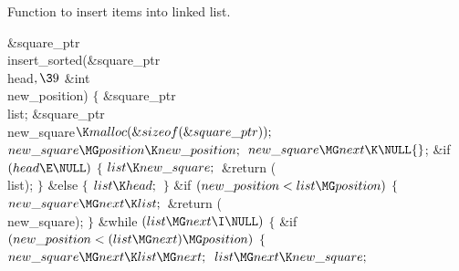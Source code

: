 Function to insert items into linked list.

\Y\B\&{square\_ptr} \\{insert\_sorted}(\&{square\_ptr} \\{head}${},\39{}$%
\&{int} \\{new\_position})\1\1\2\2\6
${}\{{}$\1\6
\&{square\_ptr} \\{list};\6
\&{square\_ptr} \\{new\_square}${}\K\\{malloc}(\&{sizeof}(\&{square\_ptr}));{}$%
\7
${}\\{new\_square}\MG\\{position}\K\\{new\_position};{}$\6
${}\\{new\_square}\MG\\{next}\K\NULL{}$;\6
\&{if} ${}(\\{head}\E\NULL){}$\5
${}\{{}$\1\6
${}\\{list}\K\\{new\_square};{}$\6
\&{return} (\\{list});\6
\4${}\}{}$\2\6
\&{else}\5
${}\{{}$\1\6
${}\\{list}\K\\{head};{}$\6
\4${}\}{}$\2\6
\&{if} ${}(\\{new\_position}<\\{list}\MG\\{position}){}$\5
${}\{{}$\1\6
${}\\{new\_square}\MG\\{next}\K\\{list};{}$\6
\&{return} (\\{new\_square});\6
\4${}\}{}$\2\6
\&{while} ${}(\\{list}\MG\\{next}\I\NULL){}$\5
${}\{{}$\1\6
\&{if} ${}(\\{new\_position}<(\\{list}\MG\\{next})\MG\\{position}){}$\5
${}\{{}$\1\6
${}\\{new\_square}\MG\\{next}\K\\{list}\MG\\{next};{}$\6
${}\\{list}\MG\\{next}\K\\{new\_square};{}$\6
